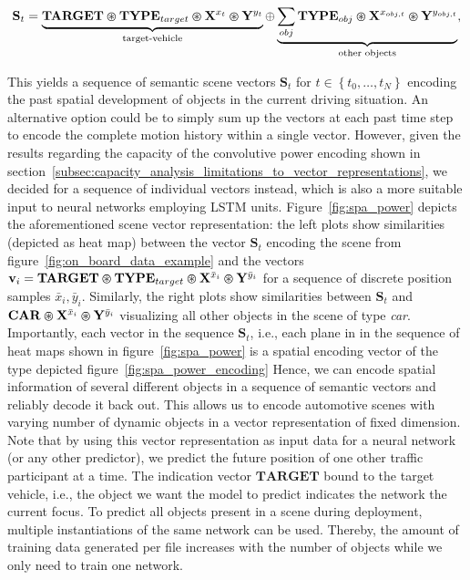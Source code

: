 \begin{equation}
	\label{eq:conv_power_enc}
  \mathbf{S}_{t} = \underbrace{\mathbf{TARGET}\varoast \mathbf{TYPE}_{target} \varoast \mathbf{X}^{x_{t}} \varoast \mathbf{Y}^{y_{t}}}_{\textrm{target-vehicle}} \oplus \underbrace{\sum_{obj} \mathbf{TYPE}_{obj} \varoast \mathbf{X}^{x_{obj,t}} \varoast \mathbf{Y}^{y_{obj,t}}}_{\textrm{other objects}},
\end{equation}

This yields a sequence of semantic scene vectors $\mathbf{S}_{t}$ for $t \in \left\{t_{0}, \ldots, t_{N} \right\}$ encoding the past spatial development of objects in the current driving situation.
An alternative option could be to simply sum up the vectors at each past time step to encode the complete motion history within a single vector.
However, given the results regarding the capacity of the convolutive power encoding shown in section~\ref{subsec:capacity_analysis_limitations_to_vector_representations}, we decided for a sequence of individual vectors instead, which is also a more suitable input to neural networks employing \ac{LSTM} units.
Figure~\ref{fig:spa_power} depicts the aforementioned scene vector representation: the left plots show similarities (depicted as heat map) between the vector $\mathbf{S}_{t}$ encoding the scene from figure~\ref{fig:on_board_data_example} and the vectors $ \mathbf{v}_{i}=\mathbf{TARGET}\varoast \mathbf{TYPE}_{target} \varoast \mathbf{X}^{\bar{x}_{i}} \varoast \mathbf{Y}^{\bar{y}_{i}}$ for a sequence of discrete position samples ${\bar{x}_{i}, \bar{y}_{i}}$.
Similarly, the right plots show similarities between $\mathbf{S}_{t}$ and $\mathbf{CAR} \varoast \mathbf{X}^{\bar{x}_{i}} \varoast \mathbf{Y}^{\bar{y}_{i}}$ visualizing all other objects in the scene of type \emph{car}.
Importantly, each vector in the sequence $ \mathbf{S}_{t}$, i.e., each plane in in the sequence of heat maps shown in figure~\ref{fig:spa_power} is a spatial encoding vector of the type depicted figure~\ref{fig:spa_power_encoding}
Hence, we can encode spatial information of several different objects in a sequence of semantic vectors and reliably decode it back out.
This allows us to encode automotive scenes with varying number of dynamic objects in a vector representation of fixed dimension.
Note that by using this vector representation as input data for a neural network (or any other predictor), we predict the future position of one other traffic participant at a time.
The indication vector $\mathbf{TARGET}$ bound to the target vehicle, i.e., the object we want the model to predict indicates the network the current focus.
To predict all objects present in a scene during deployment, multiple instantiations of the same network can be used.
Thereby, the amount of training data generated per file increases with the number of objects while we only need to train one network.

